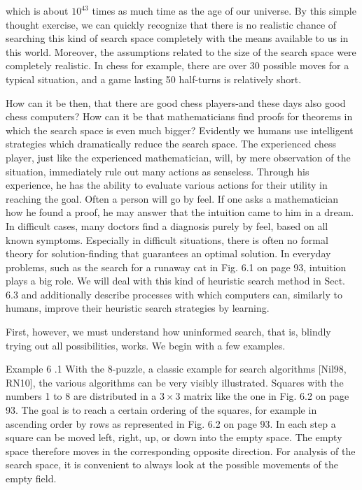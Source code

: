 \documentclass[10pt]{article}
\begin{document}
which is about $10^{43}$ times as much time as the age of our universe. By this simple thought exercise, we can quickly recognize that there is no realistic chance of searching this kind of search space completely with the means available to us in this world. Moreover, the assumptions related to the size of the search space were completely realistic. In chess for example, there are over 30 possible moves for a typical situation, and a game lasting 50 half-turns is relatively short.

How can it be then, that there are good chess players-and these days also good chess computers? How can it be that mathematicians find proofs for theorems in which the search space is even much bigger? Evidently we humans use intelligent strategies which dramatically reduce the search space. The experienced chess player, just like the experienced mathematician, will, by mere observation of the situation, immediately rule out many actions as senseless. Through his experience, he has the ability to evaluate various actions for their utility in reaching the goal. Often a person will go by feel. If one asks a mathematician how he found a proof, he may answer that the intuition came to him in a dream. In difficult cases, many doctors find a diagnosis purely by feel, based on all known symptoms. Especially in difficult situations, there is often no formal theory for solution-finding that guarantees an optimal solution. In everyday problems, such as the search for a runaway cat in Fig. 6.1 on page 93, intuition plays a big role. We will deal with this kind of heuristic search method in Sect. 6.3 and additionally describe processes with which computers can, similarly to humans, improve their heuristic search strategies by learning.

First, however, we must understand how uninformed search, that is, blindly trying out all possibilities, works. We begin with a few examples.

Example 6
.1 With the 8-puzzle, a classic example for search algorithms [Nil98, RN10], the various algorithms can be very visibly illustrated. Squares with the numbers 1 to 8 are distributed in a $3 \times 3$ matrix like the one in Fig. 6.2 on page 93. The goal is to reach a certain ordering of the squares, for example in ascending order by rows as represented in Fig. 6.2 on page 93. In each step a square can be moved left, right, up, or down into the empty space. The empty space therefore moves in the corresponding opposite direction. For analysis of the search space, it is convenient to always look at the possible movements of the empty field.
\end{document}
